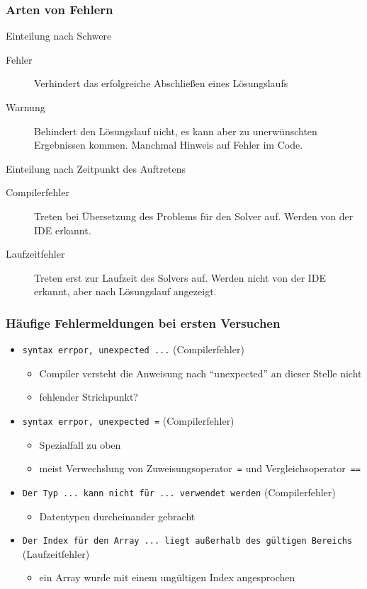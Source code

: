 \begin{frame}
 \frametitle{Arten von Fehlern}
 \begin{block}{Einteilung nach Schwere}
  \begin{description}
   \item[Fehler] Verhindert das erfolgreiche Abschließen eines Lösungslaufs
   \item[Warnung] Behindert den Lösungslauf nicht, es kann aber zu unerwünschten Ergebnissen kommen. Manchmal Hinweis auf Fehler im Code.
  \end{description}
 \end{block}
 \begin{block}{Einteilung nach Zeitpunkt des Auftretens}
  \begin{description}
   \item[Compilerfehler] Treten bei Übersetzung des Problems für den Solver auf. Werden von der IDE erkannt.
   \item[Laufzeitfehler] Treten erst zur Laufzeit des Solvers auf. Werden nicht von der IDE erkannt, aber nach Lösungslauf angezeigt.
  \end{description}
 \end{block}
\end{frame}

\begin{frame}
 \frametitle{Häufige Fehlermeldungen bei ersten Versuchen}
 \begin{itemize}
  \item \texttt{syntax errpor, unexpected ...} (Compilerfehler)
  \begin{itemize}
   \item Compiler versteht die Anweisung nach "`unexpected"' an dieser Stelle nicht
   \item fehlender Strichpunkt?
  \end{itemize}
  \item \texttt{syntax errpor, unexpected =} (Compilerfehler)
  \begin{itemize}
   \item Spezialfall zu oben
   \item meist Verwechslung von Zuweisungsoperator~\texttt{=} und Vergleichsoperator~\texttt{==}
  \end{itemize}
  \item \texttt{Der Typ ... kann nicht für ... verwendet werden} (Compilerfehler)
  \begin{itemize}
   \item Datentypen durcheinander gebracht
  \end{itemize}
  \item \texttt{Der Index für den Array ... liegt außerhalb des gültigen Bereichs} (Laufzeitfehler)
  \begin{itemize}
   \item ein Array wurde mit einem ungültigen Index angesprochen
  \end{itemize}
 \end{itemize}
\end{frame}

